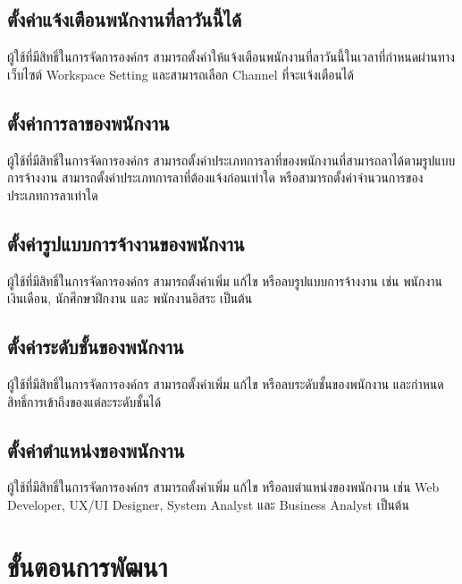 \subsection{ตั้งค่าแจ้งเตือนพนักงานที่ลาวันนี้ได้}
ผู้ใช้ที่มีสิทธิ์ในการจัดการองค์กร สามารถตั้งค่าให้แจ้งเตือนพนักงานที่ลาวันนี้ในเวลาที่กำหนดผ่านทางเว็บไซต์ Workspace Setting และสามารถเลือก Channel ที่จะแจ้งเตือนได้
\subsection{ตั้งค่าการลาของพนักงาน}
ผู้ใช้ที่มีสิทธิ์ในการจัดการองค์กร สามารถตั้งค่าประเภทการลาที่ของพนักงานที่สามารถลาได้ตามรูปแบบการจ้างงาน สามารถตั้งค่าประเภทการลาที่ต้องแจ้งก่อนเท่าใด หรือสามารถตั้งค่าจำนวนการของประเภทการลาเท่าใด
\subsection{ตั้งค่ารูปแบบการจ้างานของพนักงาน}
ผู้ใช้ที่มีสิทธิ์ในการจัดการองค์กร สามารถตั้งค่าเพิ่ม แก้ไข หรือลบรูปแบบการจ้างงาน เช่น พนักงานเงินเดือน, นักศึกษาฝึกงาน และ พนักงานอิสระ เป็นต้น
\subsection{ตั้งค่าระดับชั้นของพนักงาน}
ผู้ใช้ที่มีสิทธิ์ในการจัดการองค์กร สามารถตั้งค่าเพิ่ม แก้ไข หรือลบระดับชั้นของพนักงาน และกำหนดสิทธิ์การเข้าถึงของแต่ละระดับชั้นได้
\subsection{ตั้งค่าตำแหน่งของพนักงาน}
ผู้ใช้ที่มีสิทธิ์ในการจัดการองค์กร สามารถตั้งค่าเพิ่ม แก้ไข หรือลบตำแหน่งของพนักงาน เช่น Web Developer, UX/UI Designer, System Analyst และ Business Analyst เป็นต้น
\section{ขั้นตอนการพัฒนา}

